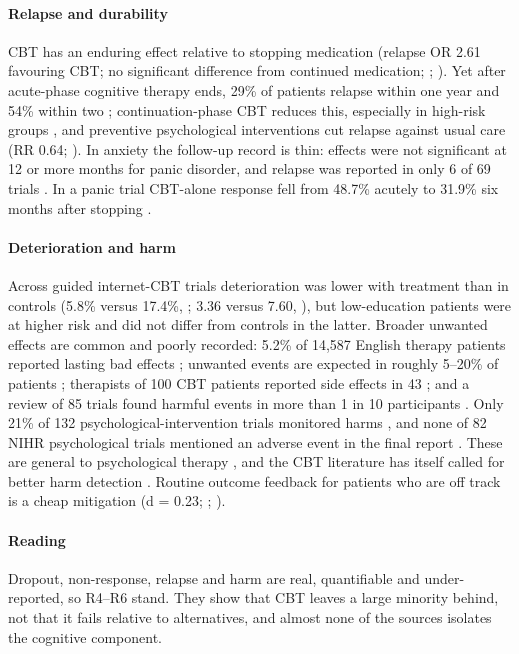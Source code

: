 \paragraph{Relapse and durability} CBT has an enduring effect relative to stopping medication (relapse OR 2.61 favouring CBT; no significant difference from continued medication; \citealp{Cuijpers2013Enduring}; \citealp{Hollon2005Relapse}). Yet after acute-phase cognitive therapy ends, 29\% of patients relapse within one year and 54\% within two \citep{Vittengl2007Relapse}; continuation-phase CBT reduces this, especially in high-risk groups \citep{Jarrett2001Continuation}, and preventive psychological interventions cut relapse against usual care (RR 0.64; \citealp{Biesheuvel2015Recurrence}). In anxiety the follow-up record is thin: effects were not significant at 12 or more months for panic disorder, and relapse was reported in only 6 of 69 trials \citep{VanDis2020LongTerm}. In a panic trial CBT-alone response fell from 48.7\% acutely to 31.9\% six months after stopping \citep{Barlow2000Panic}.

\paragraph{Deterioration and harm} Across guided internet-CBT trials deterioration was lower with treatment than in controls (5.8\% versus 17.4\%, \citealp{Rozental2017Deterioration}; 3.36 versus 7.60, \citealp{Ebert2016Deterioration}), but low-education patients were at higher risk and did not differ from controls in the latter. Broader unwanted effects are common and poorly recorded: 5.2\% of 14,587 English therapy patients reported lasting bad effects \citep{Crawford2016Negative}; unwanted events are expected in roughly 5--20\% of patients \citep{Linden2014Rate}; therapists of 100 CBT patients reported side effects in 43 \citep{SchermulyHaupt2018Unwanted}; and a review of 85 trials found harmful events in more than 1 in 10 participants \citep{Klatte2023Adverse}. Only 21\% of 132 psychological-intervention trials monitored harms \citep{Jonsson2014Harms}, and none of 82 NIHR psychological trials mentioned an adverse event in the final report \citep{Duggan2014Adverse}. These are general to psychological therapy \citep{Lilienfeld2007Harm}, and the CBT literature has itself called for better harm detection \citep{Barlow2010Negative}. Routine outcome feedback for patients who are off track is a cheap mitigation (d = 0.23; \citealp{Delgadillo2018Feedback}; \citealp{Lambert2018Feedback}).

\paragraph{Reading} Dropout, non-response, relapse and harm are real, quantifiable and under-reported, so R4--R6 stand. They show that CBT leaves a large minority behind, not that it fails relative to alternatives, and almost none of the sources isolates the cognitive component.

